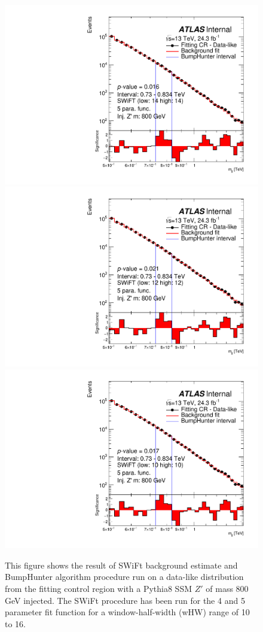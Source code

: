\begin{figure}[!htb]
{}
 {
  \includegraphics[width=0.3\linewidth, angle=0]{figs/Dibjet/LowMass/FitStudy/bhFit_corrFitCR_dataLike_5para_low14_high14_inj_Zprimebb800_xsFactor1.pdf}
}\\
 {
  \includegraphics[width=0.3\linewidth, angle=0]{figs/Dibjet/LowMass/FitStudy/bhFit_corrFitCR_dataLike_5para_low12_high12_inj_Zprimebb800_xsFactor1.pdf}
}
 {
  \includegraphics[width=0.3\linewidth, angle=0]{figs/Dibjet/LowMass/FitStudy/bhFit_corrFitCR_dataLike_5para_low10_high10_inj_Zprimebb800_xsFactor1.pdf}
}
\vspace{10pt}
\caption{\label{fig:app-bhFit_lm_corrFitCR_dataLike_inj_Zprimebb800_xsFactor1}
  This figure shows the result of SWiFt background estimate and {\sc BumpHunter} algorithm procedure run on a data-like distribution
  from the fitting control region with a Pythia8 SSM $Z'$ of mass 800 GeV injected.
  The SWiFt procedure has been run for the 4 and 5 parameter fit function for a window-half-width (wHW) range of 10 to 16.
}
\end{figure}

